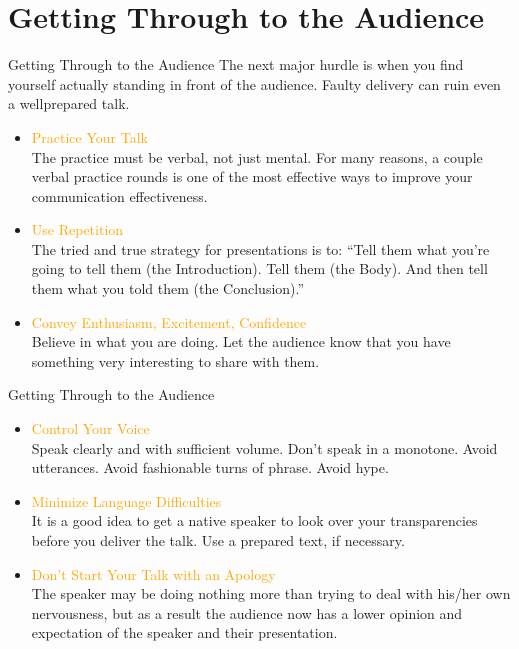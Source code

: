 \documentclass[
 size=14pt,
 paper=smartboard,  %
 mode=present, 		%
 display=slides, 	%
 style=tuliplab,  	%
 pauseslide,
 fleqn,leqno]{powerdot}
\begin{document}
\section{Getting Through to the Audience}
\begin{slide}[toc=,bm=]{Getting Through to the Audience}
The next major hurdle is when you find yourself actually
standing in front of the audience.
Faulty delivery can ruin even a wellprepared talk.

\begin{itemize}
  \item \textcolor{orange}{Practice Your Talk}\\
   The practice must be verbal, not just mental.
   For many reasons,
   a couple verbal practice rounds is one of the most
   effective ways to improve your communication effectiveness.

  \item \textcolor{orange}{Use Repetition}\\
  The tried and true strategy for presentations is to:
  ``Tell them what you're going to tell them (the Introduction).
  Tell them (the Body).
  And then tell them what you told them (the Conclusion).''

  \item \textcolor{orange}{Convey Enthusiasm, Excitement,
  Confidence}\\
  Believe in what you are doing.
  Let the audience know that you have something very
  interesting to share with them.
\end{itemize}
\end{slide}

\begin{slide}[toc=,bm=]{Getting Through to the Audience}
\begin{itemize}
\item \textcolor{orange}{Control Your Voice}\\
  Speak clearly and with sufficient volume.
  Don't speak in a monotone.
  Avoid utterances.
  Avoid fashionable turns of phrase.
  Avoid hype.

  \item \textcolor{orange}{Minimize Language Difficulties}\\
  It is a good idea to
  get a native speaker to look over your
  transparencies before you deliver the talk.
  Use a prepared text,
  if necessary.

  \item \textcolor{orange}{Don't Start Your Talk with an Apology}\\
  The speaker may be doing nothing more than
  trying to deal with his/her own nervousness,
  but as a result the audience now has a lower
  opinion and expectation of the speaker and their presentation.
\end{itemize}
\end{slide}
\end{document}
